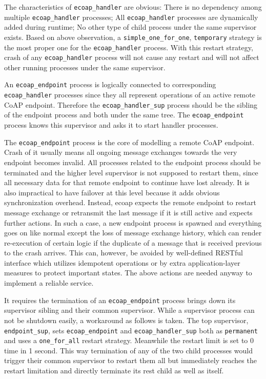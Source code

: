 The characteristics of \verb|ecoap_handler| are obvious: There is no dependency among multiple \verb|ecoap_handler| processes; All \verb|ecoap_handler| processes are dynamically added during runtime; No other type of child process under the same supervisor exists. Based on above observation, a \verb|simple_one_for_one|, \verb|temporary| strategy is the most proper one for the \verb|ecoap_handler| process. With this restart strategy, crash of any \verb|ecoap_handler| process will not cause any restart and will not affect other running processes under the same supervisor.

An \verb|ecoap_endpoint| process is logically connected to corresponding \verb|ecoap_handler| processes since they all represent operations of an active remote CoAP endpoint. Therefore the \verb|ecoap_handler_sup| process should be the sibling of the endpoint process and both under the same tree. The \verb|ecoap_endpoint| process knows  this supervisor and asks it to start handler processes.

The \verb|ecoap_endpoint| process is the core of modelling a remote CoAP endpoint. Crash of it usually means all ongoing message exchanges towards the very endpoint becomes invalid. All processes related to the endpoint process should be terminated and the higher level supervisor is not supposed to restart them, since all necessary data for that remote endpoint to continue have lost already. It is also impractical to have failover at this level because it adds obvious synchronization overhead. Instead, ecoap expects the remote endpoint to restart message exchange or retransmit the last message if it is still active and expects further actions. In such a case, a new endpoint process is spawned and everything goes on like normal except the loss of message exchange history, which can render re-execution of certain logic if the duplicate of a message that is received previous to the crash arrives. This can, however, be avoided by well-defined RESTful interface which utilizes idempotent operations or by extra application-layer measures to protect important states. The above actions are needed anyway to implement a reliable service.

It requires the termination of an \verb|ecoap_endpoint| process brings down its supervisor sibling and their common supervisor. While a supervisor process can not be shutdown easily, a workaround as follows is taken. The top supervisor, \verb|endpoint_sup|, sets \verb|ecoap_endpoint| and \verb|ecoap_handler_sup| both as \verb|permanent| and uses a \verb|one_for_all| restart strategy. Meanwhile the restart limit is set to 0 time in 1 second. This way termination of any of the two child processes would trigger their common supervisor to restart them all but immediately reaches the restart limitation and directly terminate its rest child as well as itself. 

